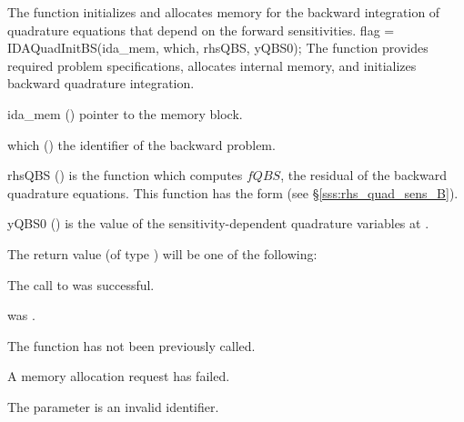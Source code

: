 The function  initializes and allocates memory for the backward
integration of quadrature equations that depend on the forward sensitivities.
{
flag = IDAQuadInitBS(ida\_mem, which, rhsQBS, yQBS0);
}
{
  The function  provides required problem specifications,
  allocates internal memory, and initializes backward quadrature integration.
}
{
  \begin{args}
  \item[ida\_mem] ()
    pointer to the {\idas} memory block.
  \item[which] ()
    the identifier of the backward problem.
  \item[rhsQBS] ()
    is the {\CC} function which computes $fQBS$, the residual of the 
    backward quadrature equations. This function has the form 
    (see \S\ref{sss:rhs_quad_sens_B}).
  \item[yQBS0] ()
    is the value of the sensitivity-dependent quadrature variables at .
  \end{args}
}
{
  The return value  (of type ) will be one of the following:
  \begin{args}
  \item[\Id{IDA\_SUCCESS}]
    The call to  was successful.
  \item[\Id{IDA\_MEM\_NULL}] 
     was .
  \item[\Id{IDA\_NO\_ADJ}]
    The function  has not been previously called.
  \item[\Id{IDA\_MEM\_FAIL}] 
    A memory allocation request has failed.
  \item[\Id{IDA\_ILL\_INPUT}]
    The parameter  is an invalid identifier.
  \end{args}
}
{}


